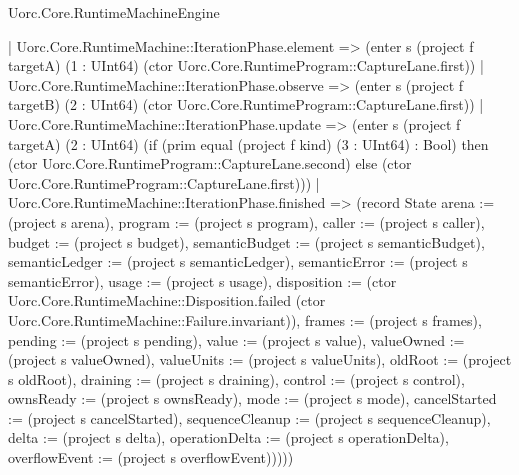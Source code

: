 \begin{lexlean}{Uorc.Core.RuntimeMachineEngine}
\begin{semanticmodule}
{        | Uorc.Core.RuntimeMachine::IterationPhase.element => (enter s (project f targetA) (1 : UInt64) (ctor Uorc.Core.RuntimeProgram::CaptureLane.first))
        | Uorc.Core.RuntimeMachine::IterationPhase.observe => (enter s (project f targetB) (2 : UInt64) (ctor Uorc.Core.RuntimeProgram::CaptureLane.first))
        | Uorc.Core.RuntimeMachine::IterationPhase.update => (enter s (project f targetA) (2 : UInt64) (if (prim equal (project f kind) (3 : UInt64) : Bool) then (ctor Uorc.Core.RuntimeProgram::CaptureLane.second) else (ctor Uorc.Core.RuntimeProgram::CaptureLane.first)))
        | Uorc.Core.RuntimeMachine::IterationPhase.finished => (record State {arena := (project s arena), program := (project s program), caller := (project s caller), budget := (project s budget), semanticBudget := (project s semanticBudget), semanticLedger := (project s semanticLedger), semanticError := (project s semanticError), usage := (project s usage), disposition := (ctor Uorc.Core.RuntimeMachine::Disposition.failed (ctor Uorc.Core.RuntimeMachine::Failure.invariant)), frames := (project s frames), pending := (project s pending), value := (project s value), valueOwned := (project s valueOwned), valueUnits := (project s valueUnits), oldRoot := (project s oldRoot), draining := (project s draining), control := (project s control), ownsReady := (project s ownsReady), mode := (project s mode), cancelStarted := (project s cancelStarted), sequenceCleanup := (project s sequenceCleanup), delta := (project s delta), operationDelta := (project s operationDelta), overflowEvent := (project s overflowEvent)}))))
}
\end{semanticmodule}
\end{lexlean}

